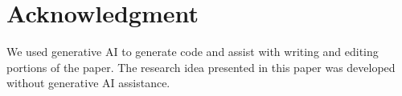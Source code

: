 \section*{Acknowledgment}

We used generative AI to generate code and assist with writing and editing portions of the paper. The research idea presented in this paper was developed without generative AI assistance.
